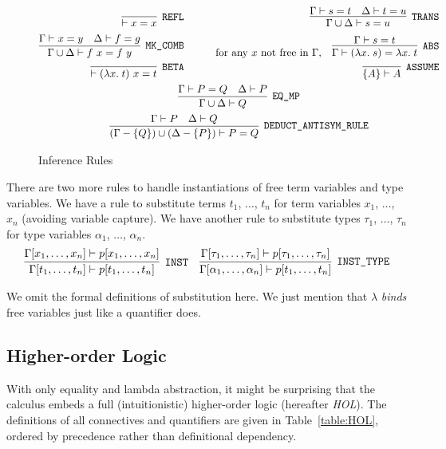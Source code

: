 \begin{figure}
  \begin{gather*}
    \begin{aligned}
      \infer[\code{REFL}]{\vdash x = x}{} &\qquad&
      \infer[\code{TRANS}]{\Gamma\cup\Delta\vdash s=u}{\Gamma\vdash s=t&\Delta\vdash t=u}\\
      \infer[\code{MK\_COMB}]{\Gamma\cup\Delta\vdash f\ x=f\ y}{\Gamma\vdash x = y & \Delta \vdash f = g} &&
      \text{for any $x$ not free in $\Gamma$,}\quad\infer[\code{ABS}]{\Gamma \vdash (\lambda x.\; s) = \lambda x.\; t}{\Gamma \vdash s = t}\\
      \infer[\code{BETA}]{\vdash (\lambda x.\; t)\ x = t}{}&&
      \infer[\code{ASSUME}]{\{A\} \vdash A}{}
    \end{aligned}\\
    \infer[\code{EQ\_MP}]{\Gamma\cup\Delta\vdash Q}{\Gamma\vdash P = Q & \Delta\vdash P}\\
    \infer[\code{DEDUCT\_ANTISYM\_RULE}]{(\Gamma - \{Q\})\cup(\Delta - \{P\})\vdash P = Q}{\Gamma\vdash P & \Delta\vdash Q}\\
  \end{gather*}
  \caption{Inference Rules}
  \label{fig:HOLInferenceRules}
\end{figure}

There are two more rules to handle instantiations of free term variables and type variables. We have a rule to substitute terms $t_1$, $\ldots$, $t_n$ for term variables $x_1$, $\ldots$, $x_n$ (avoiding variable capture). We have another rule to substitute types $\tau_1$, $\ldots$, $\tau_n$ for type variables $\alpha_1$, $\ldots$, $\alpha_n$.
\begin{align*}
  \infer[\code{INST}]{\Gamma[t_1,\ldots,t_n]
    \vdash p[t_1,\ldots,t_n]}
  {\Gamma[x_1,\ldots,x_n]\vdash p[x_1,\ldots,x_n]}&&
  \infer[\code{INST\_TYPE}]{\Gamma[\alpha_1,\ldots,\alpha_n]
    \vdash p[t_1,\ldots,t_n]}
  {\Gamma[\tau_1,\ldots,\tau_n]\vdash p[\tau_1,\ldots,\tau_n]}
\end{align*}

We omit the formal definitions of substitution here. We just mention that $\lambda$ \emph{binds} free variables just like a quantifier does.

\subsection{Higher-order Logic}
With only equality and lambda abstraction, it might be surprising that the calculus embeds a full (intuitionistic) higher-order logic (hereafter \emph{HOL}). The definitions of all connectives and quantifiers are given in Table~\ref{table:HOL}, ordered by precedence rather than definitional dependency.

